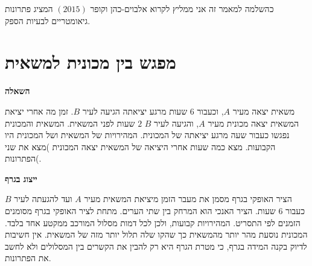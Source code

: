 \documentclass[12pt,a4paper]{article}
\begin{document}
כהשלמה למאמר זה אני ממליץ לקרוא אלבוים-כהן וקופר
$(2015)$
המציג פתרונות גיאומטריים לבעיות הספק.


\newpage

\section*{מפגש בין מכונית למשאית}

\textbf{השאלה}

משאית יצאה מעיר
$A$,
וכעבור 
$6$
שעות מרגע יציאתה הגיעה לעיר
$B$.
זמן מה אחרי יציאת המשאית יצאה מכונית מעיר
$A$,
והגיעה לעיר
$B$
$2$
שעות לפני המשאית. המשאית והמכונית נפגשו כעבור שעה מרגע יציאתה של המכונית. המהירויות של המשאית ושל המכונית היו הקבועות. מצא כמה שעות אחרי היציאה של המשאית יצאה המכונית )מצא את שני הפתרונות(.

\textbf{ייצוג בגרף}

הציר האופקי בגרף מסמן את מעבר הזמן מיציאת המשאית מעיר
$A$
ועד להגעתה לעיר
$B$
כעבור
$6$
שעות. הציר האנכי הוא המרחק בין שתי הערים. מתחת לציר האופקי בגרף מסומנים הזמנים לפי התסריט. המהירויות קבועות, ולכן לכל דמות מסלול המורכב ממקטע אחד בלבד. המכונית נוסעת מהר יותר מהמשאית כך שהקו שלה תלול יותר מזה של המשאית. אין חשיבות לדיוק בקנה המידה בגרף, כי מטרת הגרף היא רק להבין את הקשרים בין המסלולים ולא לחשב את הפתרונות.

\begin{center}
\end{center}
\end{document}

